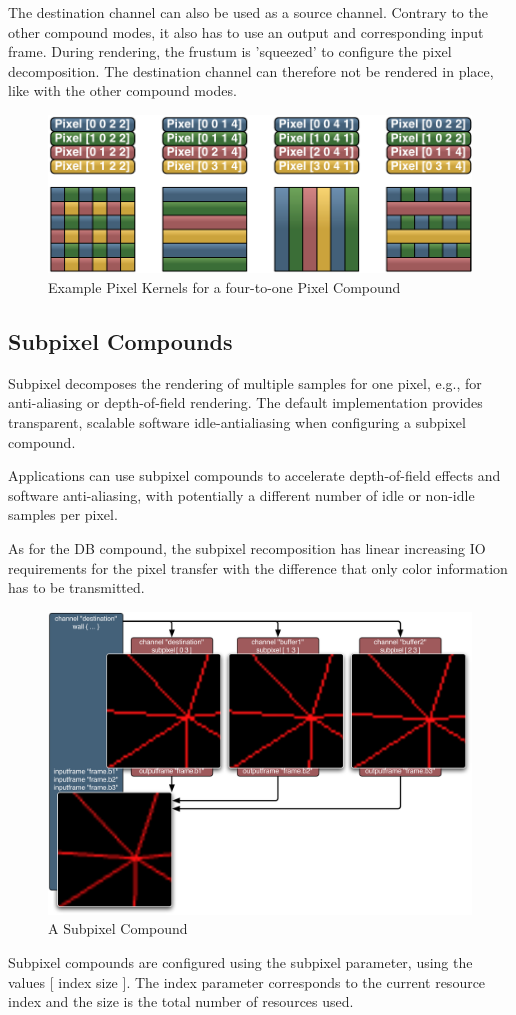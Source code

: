 \documentclass[10pt,a4]{scrartcl}
\begin{document}
The destination channel can also be used as a source channel. Contrary
to the other compound modes, it also has to use an output and
corresponding input frame. During rendering, the frustum is 'squeezed'
to configure the pixel decomposition. The destination channel can
therefore not be rendered in place, like with the other compound modes.
\begin{figure}[ht!]\center
  \includegraphics[width=.9\textwidth]{images/pixelKernels.pdf}
  {\caption{\label{fPixelKernels}Example Pixel Kernels for a
      four-to-one Pixel Compound}}
\end{figure}


\subsection{\label{sSubpixel}Subpixel Compounds}

Subpixel decomposes the rendering of multiple samples for one pixel, e.g., for
anti-aliasing or depth-of-field rendering. The default implementation provides
transparent, scalable software idle-antialiasing when configuring a subpixel
compound.

Applications can use subpixel compounds to accelerate depth-of-field effects and
software anti-aliasing, with potentially a different number of idle or non-idle
samples per pixel.

As for the DB compound, the subpixel recomposition has linear increasing 
IO requirements for the pixel transfer with the difference that only 
color information has to be transmitted.

\begin{figure}
  \includegraphics[width=.618\textwidth]{images/Subpixel.pdf}
  {\caption{\label{fSubpixel}\small A Subpixel Compound}}
\end{figure}
Subpixel compounds are configured using the \textsf{subpixel} parameter, using
the values \textsf{[ index size ]}. The \textsf{index} parameter corresponds to
the current resource index and the \textsf{size} is the total number of
resources used.
\end{document}
